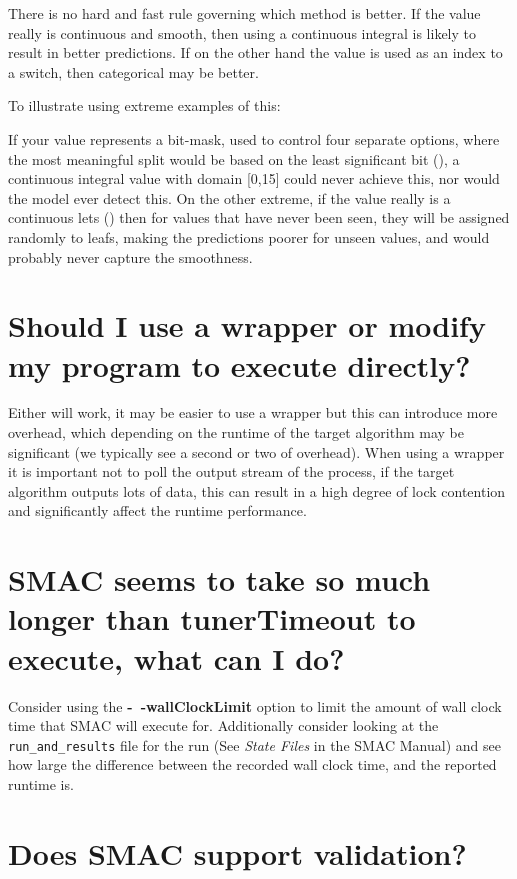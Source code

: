 \documentclass[11pt,letterpaper,oneside]{article}
\begin{document}
	There is no hard and fast rule governing which method is better. If the value really is continuous and smooth, then using a continuous integral is likely to result in better predictions. If on the other hand the value is used as an index to a switch, then categorical may be better. 
	
	To illustrate using extreme examples of this:
	
	If your value represents a bit-mask, used to control four separate options, where the most meaningful split would be based on the least significant bit (), a continuous integral value with domain [0,15] could never achieve this, nor would the model ever detect this. On the other extreme, if the value really is a continuous lets (\eg{[0, 1024]}) then for values that have never been seen, they will be assigned randomly to leafs, making the predictions poorer for unseen values, and would probably never capture the smoothness.
		
		
\section{Should I use a wrapper or modify my program to execute directly?} 

	Either will work, it may be easier to use a wrapper but this can introduce more overhead, which depending on the runtime of the target algorithm may be significant (we typically see a second or two of overhead). When using a wrapper it is important not to poll the output stream of the process, if the target algorithm outputs lots of data, this can result in a high degree of lock contention and significantly affect the runtime performance.
	
\section{SMAC seems to take so much longer than tunerTimeout to execute, what can I do?}

	Consider using the \textbf{-~$\!$-wallClockLimit} option to limit the amount of wall clock time that SMAC will execute for. Additionally consider looking at the \texttt{run\_and\_results} file for the run (See \emph{State Files} in the SMAC Manual) and see how large the difference between the recorded wall clock time, and the reported runtime is.

\section{Does SMAC support validation?}
\end{document}

